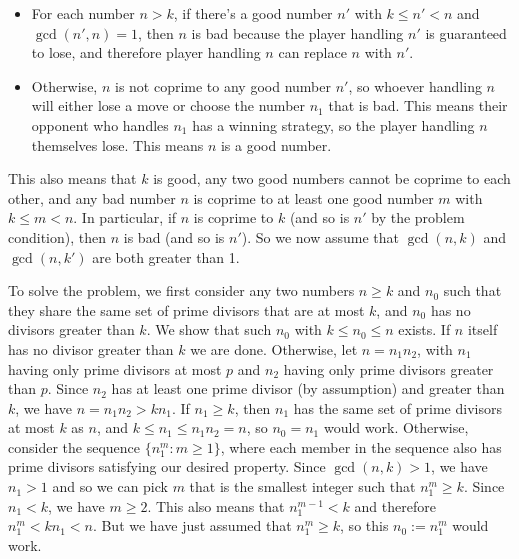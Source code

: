 \documentclass[11pt,a4paper]{article}
\begin{document}
\begin{enumerate}
\begin{itemize}
		\item For each number $n>k$, if there's a good number $n'$ with $k\le n'<n$ and $\gcd(n', n)=1$, then $n$ is bad because the player handling $n'$ is guaranteed to lose, and therefore player handling $n$ can replace $n$ with $n'$. 
		
		\item Otherwise, $n$ is not coprime to any good number $n'$, so whoever handling $n$ will either lose a move or choose the number $n_1$ that is bad. This means their opponent who handles $n_1$ has a winning strategy, so the player handling $n$ themselves lose. This means $n$ is a good number. 
		
		\end{itemize}
		This also means that $k$ is good, any two good numbers cannot be coprime to each other, and any bad number $n$ is coprime to at least one good number $m$ with $k\le m<n$. 
		In particular, if $n$ is coprime to $k$ (and so is $n'$ by the problem condition), then $n$ is bad (and so is $n'$). So we now assume that $\gcd(n, k)$ and $\gcd(n, k')$ are both greater than 1. 
		
		To solve the problem, we first consider any two numbers $n\ge k$ and $n_0$ such that they share the same set of prime divisors that are at most $k$, and $n_0$ has no divisors greater than $k$. We show that such $n_0$ with $k\le n_0\le n$ exists. 
		If $n$ itself has no divisor greater than $k$ we are done. 
		Otherwise, let $n=n_1n_2$, with $n_1$ having only prime divisors at most $p$ and $n_2$ having only prime divisors greater than $p$. Since $n_2$ has at least one prime divisor (by assumption) and greater than $k$, we have $n=n_1n_2>kn_1$. If $n_1\ge k$, then $n_1$ has the same set of prime divisors at most $k$ as $n$, and $k\le n_1\le n_1n_2=n$, so $n_0=n_1$ would work. 
		Otherwise, consider the sequence $\{n_1^m: m\ge 1\}$, where each member in the sequence also has prime divisors satisfying our desired property. 
		Since $\gcd(n, k)>1$, we have $n_1>1$ and so we can pick $m$ that is the smallest integer such that $n_1^m\ge k$. Since $n_1<k$, we have $m\ge 2$. This also means that $n_1^{m-1}<k$ and therefore $n_1^m<kn_1<n$. But we have just assumed that $n_1^m\ge k$, so this $n_0:=n_1^m$ would work. 
		

\end{enumerate}
\end{document}
